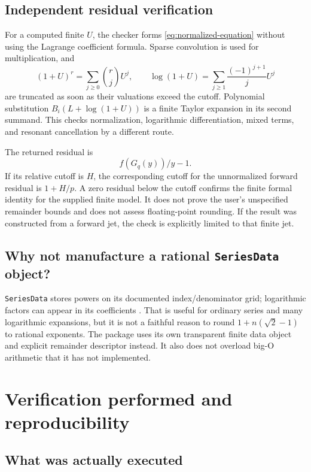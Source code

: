 \documentclass[11pt,a4paper]{article}
\numberwithin{equation}{section}
\theoremstyle{definition}
\theoremstyle{remark}
\begin{document}
\subsection{Independent residual verification}

For a computed finite $U$, the checker forms \eqref{eq:normalized-equation}
without using the Lagrange coefficient formula. Sparse convolution is used
for multiplication, and
\[
 (1+U)^r=\sum_{j\ge0}\binom rjU^j,\qquad
 \log(1+U)=\sum_{j\ge1}\frac{(-1)^{j+1}}jU^j
\]
are truncated as soon as their valuations exceed the cutoff. Polynomial
substitution $B_i(L+\log(1+U))$ is a finite Taylor expansion in its second
summand. This checks normalization, logarithmic differentiation, mixed
terms, and resonant cancellation by a different route.

The returned residual is
\[
 f(G_q(y))/y-1.
\]
If its relative cutoff is $H$, the corresponding cutoff for the unnormalized
forward residual is $1+H/p$. A zero residual below the cutoff confirms the
finite formal identity for the supplied finite model. It does not prove the
user's unspecified remainder bounds and does not assess floating-point
rounding. If the result was constructed from a forward jet, the check is
explicitly limited to that finite jet.

\subsection{Why not manufacture a rational \texttt{SeriesData} object?}

\texttt{SeriesData} stores powers on its documented index/denominator grid;
logarithmic factors can appear in its coefficients
\cite{wlseriesdata}. That is useful for ordinary series and many logarithmic
expansions, but it is not a faithful reason to round
$1+n(\sqrt2-1)$ to rational exponents. The package uses its own transparent
finite data object and explicit remainder descriptor instead. It also does
not overload big-O arithmetic that it has not implemented.

\section{Verification performed and reproducibility}
\label{sec:verification}

\subsection{What was actually executed}
\end{document}
